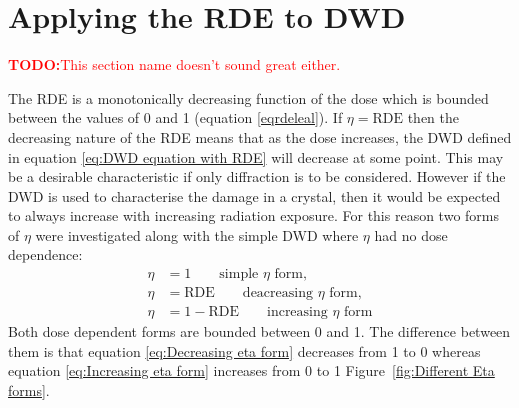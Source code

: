\section{Applying the RDE to DWD}
\label{sec:Applying the RDE to DWD}
\textcolor{red}{
    \begin{myenumerate}
        \item \hypertarget{todo:change section name}{\textbf{TODO:}This section name doesn't sound great either.}
    \end{myenumerate}
}
The RDE is a monotonically decreasing function of the dose which is bounded between the values of 0 and 1 (equation \ref{eqrdeleal}).
If $\eta = \text{RDE}$ then the decreasing nature of the RDE means that as the dose increases, the DWD defined in equation \ref{eq:DWD equation with RDE} will decrease at some point.
This may be a desirable characteristic if only diffraction is to be considered.
However if the DWD is used to characterise the damage in a crystal, then it would be expected to always increase with increasing radiation exposure.
For this reason two forms of $\eta$ were investigated along with the simple DWD where $\eta$ had no dose dependence:
\begin{align}
    \eta &= 1 \qquad \text{simple $\eta$ form}, \label{eq:Simple eta form} \\
    \eta &= \text{RDE} \qquad \text{deacreasing $\eta$ form}, \label{eq:Decreasing eta form} \\
    \eta &= 1 - \text{RDE} \qquad \text{increasing $\eta$ form} \label{eq:Increasing eta form}
\end{align}
Both dose dependent forms are bounded between 0 and 1.
The difference between them is that equation \ref{eq:Decreasing eta form} decreases from 1 to 0 whereas equation \ref{eq:Increasing eta form} increases from 0 to 1 Figure~\ref{fig:Different Eta forms}.
